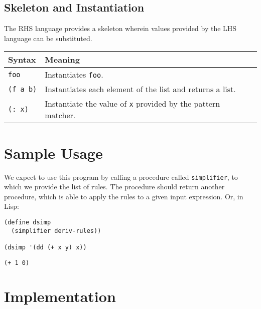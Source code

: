 \documentclass[9pt]{report}
\begin{document}
\subsection{Skeleton and Instantiation}
\label{sec:orgc5b560f}
The RHS language provides a skeleton wherein values provided by
the LHS language can be substituted.

\begin{center}
\begin{tabular}{ll}
\toprule
Syntax & Meaning\\
\midrule
\texttt{foo} & Instantiates \texttt{foo}.\\
\texttt{(f a b)} & Instantiates each element of the list and returns a list.\\
\texttt{(: x)} & Instantiate the value of \texttt{x} provided by the pattern matcher.\\
\bottomrule
\end{tabular}
\end{center}

\section{Sample Usage}
\label{sec:orgfa62d67}

We expect to use this program by calling a procedure called
\texttt{simplifier}, to which we provide the list of rules. The procedure
should return another procedure, which is able to apply the rules
to a given input expression. Or, in Lisp:

\begin{verbatim}
(define dsimp
  (simplifier deriv-rules))

(dsimp '(dd (+ x y) x))
\end{verbatim}

\begin{verbatim}
(+ 1 0)
\end{verbatim}

\section{Implementation}
\label{sec:orgc0bef4a}
\end{document}
